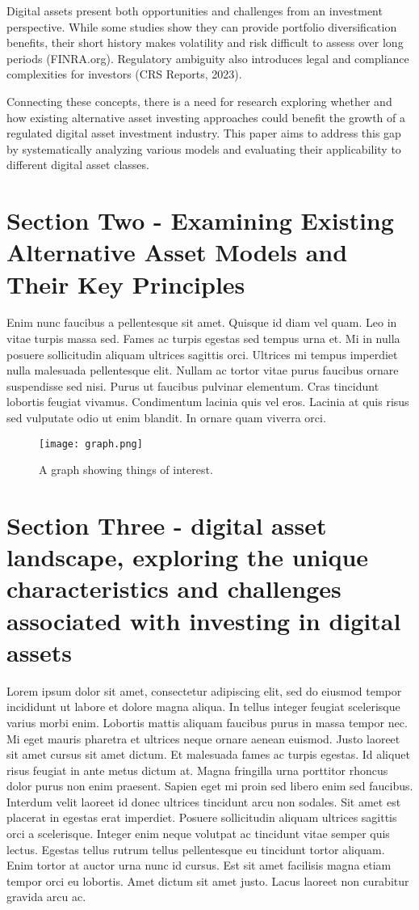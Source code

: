 \documentclass{ledger}
\begin{document}
Digital assets present both opportunities and challenges from an investment perspective. While some studies show they can provide portfolio diversification benefits, their short history makes volatility and risk difficult to assess over long periods (FINRA.org). Regulatory ambiguity also introduces legal and compliance complexities for investors (CRS Reports, 2023).

Connecting these concepts, there is a need for research exploring whether and how existing alternative asset investing approaches could benefit the growth of a regulated digital asset investment industry. This paper aims to address this gap by systematically analyzing various models and evaluating their applicability to different digital asset classes.

\section{Section Two -  Examining Existing Alternative Asset Models and Their Key Principles}
Enim nunc faucibus a pellentesque sit amet. Quisque id diam vel quam. Leo in vitae turpis massa sed. Fames ac turpis egestas sed tempus urna et. Mi in nulla posuere sollicitudin aliquam ultrices sagittis orci. Ultrices mi tempus imperdiet nulla malesuada pellentesque elit. Nullam ac tortor vitae purus faucibus ornare suspendisse sed nisi. Purus ut faucibus pulvinar elementum. Cras tincidunt lobortis feugiat vivamus. Condimentum lacinia quis vel eros. Lacinia at quis risus sed vulputate odio ut enim blandit. In ornare quam viverra orci.\cite{Smith}

\begin{figure}
\centering
\captionsetup{justification=centering}
\texttt{[image: graph.png]}
    \caption{A graph showing things of interest.}
    \label{graph1}
\end{figure}


\section{Section Three - digital asset landscape, exploring the unique characteristics and challenges associated with investing in digital assets}
Lorem ipsum dolor sit amet, consectetur adipiscing elit, sed do eiusmod tempor incididunt ut labore et dolore magna aliqua. In tellus integer feugiat scelerisque varius morbi enim. Lobortis mattis aliquam faucibus purus in massa tempor nec. Mi eget mauris pharetra et ultrices neque ornare aenean euismod. Justo laoreet sit amet cursus sit amet dictum. Et malesuada fames ac turpis egestas. Id aliquet risus feugiat in ante metus dictum at. Magna fringilla urna porttitor rhoncus dolor purus non enim praesent. Sapien eget mi proin sed libero enim sed faucibus. Interdum velit laoreet id donec ultrices tincidunt arcu non sodales. Sit amet est placerat in egestas erat imperdiet. Posuere sollicitudin aliquam ultrices sagittis orci a scelerisque. Integer enim neque volutpat ac tincidunt vitae semper quis lectus. Egestas tellus rutrum tellus pellentesque eu tincidunt tortor aliquam. Enim tortor at auctor urna nunc id cursus. Est sit amet facilisis magna etiam tempor orci eu lobortis. Amet dictum sit amet justo. Lacus laoreet non curabitur gravida arcu ac.
\end{document}

